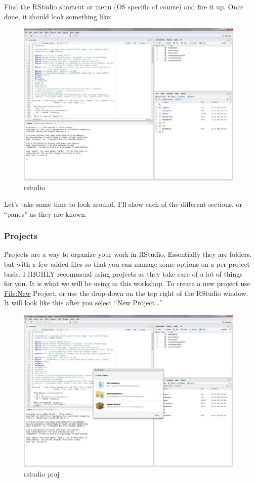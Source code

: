 \documentclass[]{article}
\begin{document}
Find the RStudio shortcut or menu (OS specific of course) and fire it
up. Once done, it should look something like:

\begin{figure}
\centering
\includegraphics{figures/rstudio.jpg}
\caption{rstudio}
\end{figure}

Let's take some time to look around. I'll show each of the different
sections, or ``panes'' as they are known.

\hypertarget{projects}{%
\subsubsection{Projects}\label{projects}}

Projects are a way to organize your work in RStudio. Essentially they
are folders, but with a few added files so that you can manage some
options on a per project basis. I HIGHLY recommend using projects as
they take care of a lot of things for you. It is what we will be using
in this workshop. To create a new project use \url{File:New} Project, or
use the drop-down on the top right of the RStudio window. It will look
like this after you select ``New Project\ldots{}''

\begin{figure}
\centering
\includegraphics{figures/rstudio_proj.jpg}
\caption{rstudio proj}
\end{figure}
\end{document}

